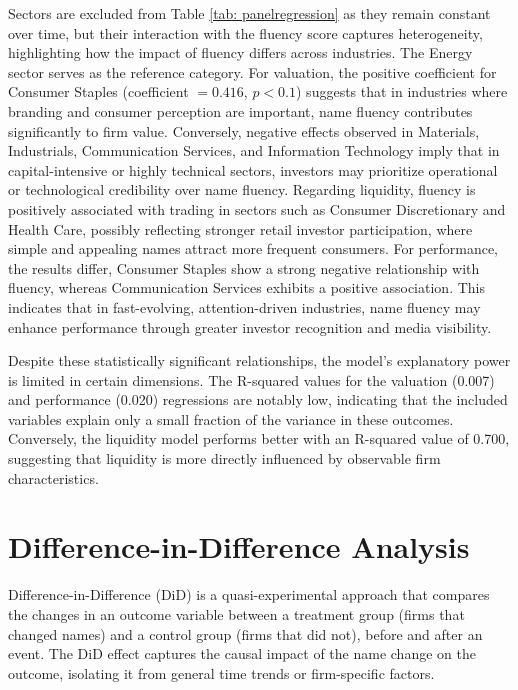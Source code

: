 \documentclass[a4paper,11pt]{report}
\begin{document}
Sectors are excluded from Table \ref{tab: panelregression} as they remain constant over time, but their interaction with the fluency score captures heterogeneity, highlighting how the impact of fluency differs across industries. The Energy sector serves as the reference category. For valuation, the positive coefficient for Consumer Staples (coefficient $=0.416$, $p < 0.1$) suggests that in industries where branding and consumer perception are important, name fluency contributes significantly to firm value. Conversely, negative effects observed in Materials, Industrials, Communication Services, and Information Technology imply that in capital-intensive or highly technical sectors, investors may prioritize operational or technological credibility over name fluency. Regarding liquidity, fluency is positively associated with trading in sectors such as Consumer Discretionary and Health Care, possibly reflecting stronger retail investor participation, where simple and appealing names attract more frequent consumers. For performance, the results differ, Consumer Staples show a strong negative relationship with fluency, whereas Communication Services exhibits a positive association. This indicates that in fast-evolving, attention-driven industries, name fluency may enhance performance through greater investor recognition and media visibility.

Despite these statistically significant relationships, the model’s explanatory power is limited in certain dimensions. The R-squared values for the valuation (0.007) and performance (0.020) regressions are notably low, indicating that the included variables explain only a small fraction of the variance in these outcomes. Conversely, the liquidity model performs better with an R-squared value of 0.700, suggesting that liquidity is more directly influenced by observable firm characteristics. 
\section{Difference-in-Difference Analysis}
Difference-in-Difference (DiD) is a quasi-experimental approach that compares the changes in an outcome variable between a treatment group (firms that changed names) and a control group (firms that did not), before and after an event. The DiD effect captures the causal impact of the name change on the outcome, isolating it from general time trends or firm-specific factors.
\end{document}
